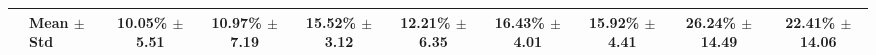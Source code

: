 \begin{table}[t]
{\begin{tabular}{ll*{8}{c}}
\midrule
 & \textbf{Mean $\pm$ Std} & 10.05\% $\pm$ 5.51 & 10.97\% $\pm$ 7.19 & 15.52\% $\pm$ 3.12 & 12.21\% $\pm$ 6.35 & 16.43\% $\pm$ 4.01 & 15.92\% $\pm$ 4.41 & 26.24\% $\pm$ 14.49 & 22.41\% $\pm$ 14.06 \\
\bottomrule
\end{tabular}
}
\end{table}
